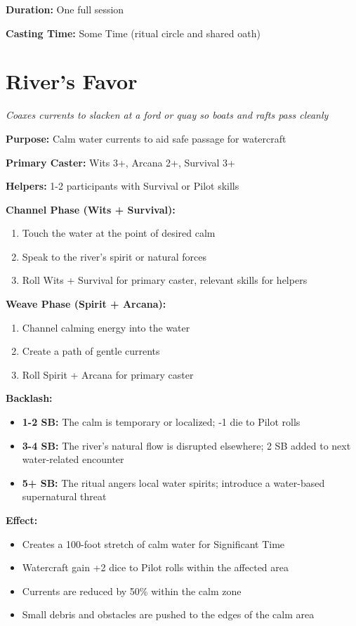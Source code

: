 \documentclass[12pt,twoside]{book}
\begin{document}
\textbf{Duration:} One full session

\textbf{Casting Time:} Some Time (ritual circle and shared oath)

	\section*{River's Favor}
	\textit{Coaxes currents to slacken at a ford or quay so boats and rafts pass cleanly}

	\textbf{Purpose:} Calm water currents to aid safe passage for watercraft

	\textbf{Primary Caster:} Wits 3+, Arcana 2+, Survival 3+

	\textbf{Helpers:} 1-2 participants with Survival or Pilot skills

	\textbf{Channel Phase (Wits + Survival):}
	\begin{enumerate}
	\item Touch the water at the point of desired calm
	\item Speak to the river's spirit or natural forces
	\item Roll Wits + Survival for primary caster, relevant skills for helpers
	\end{enumerate}

	\textbf{Weave Phase (Spirit + Arcana):}
	\begin{enumerate}
	\item Channel calming energy into the water
	\item Create a path of gentle currents
	\item Roll Spirit + Arcana for primary caster
	\end{enumerate}

	\textbf{Backlash:}
	\begin{itemize}
	\item \textbf{1-2 SB:} The calm is temporary or localized; -1 die to Pilot rolls
	\item \textbf{3-4 SB:} The river's natural flow is disrupted elsewhere; 2 SB added to next water-related encounter
	\item \textbf{5+ SB:} The ritual angers local water spirits; introduce a water-based supernatural threat
	\end{itemize}

	\textbf{Effect:}
	\begin{itemize}
	\item Creates a 100-foot stretch of calm water for Significant Time
	\item Watercraft gain +2 dice to Pilot rolls within the affected area
	\item Currents are reduced by 50\% within the calm zone
	\item Small debris and obstacles are pushed to the edges of the calm area
	\end{itemize}
\end{document}
